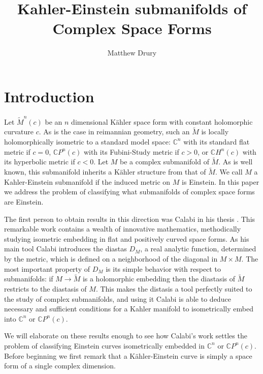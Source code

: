 \documentclass[11pt]{amsart}
\title{ Kahler-Einstein submanifolds of Complex Space Forms }
\author{ Matthew Drury }
\theoremstyle{definition}
\def \CP{ \mathbb{C}P }
\def \C{ \mathbb{C} }
\def \CH{ \mathbb{C}H }
\def \Mamb{ \mathcal{M} }
\def \Mamb{ \tilde{M} }
\begin{document}
\maketitle

\parskip 6pt
\parindent 0pt
\baselineskip 14pt

\section{Introduction}

Let $\Mamb^n(c)$ be an $n$ dimensional K\"{a}hler space form with constant holomorphic curvature $c$.  As is the case in reimannian geometry, such an $\Mamb$ is locally holomorphically isometric to a standard model space: $\C^n$ with its standard flat metric if $c=0$, $\CP^n(c)$ with its Fubini-Study metric if $c>0$, or $\CH^n(c)$ with its hyperbolic metric if $c<0$.  Let $M$ be a complex submanifold of $\Mamb$.  As is well known, this submanifold inherits a K\"{a}hler structure from that of $\Mamb$.  We call $M$ a Kahler-Einstein submanifold if the induced metric on $M$ is Einstein.  In this paper we address the problem of classifying what submanifolds of complex space forms are Einstein.

The first person to obtain results in this direction was Calabi in his thesis \cite{C1}.  This remarkable work contains a wealth of innovative mathematics, methodically studying isometric embedding in flat and positively curved space forms.  As his main tool Calabi introduces the diastas $D_M$, a real analytic function, determined by the metric, which is defined on a neighborhood of the diagonal in $M \times M$.  The most important property of $D_M$ is its simple behavior with respect to submanifolds:  if $M \rightarrow \Mamb$ is a holomorphic embedding then the diastasis of $\Mamb$ restricts to the diastasis of $M$.  This makes the distasis a tool perfectly suited to the study of complex submanifolds, and using it Calabi is able to deduce necessary and sufficient conditions for a Kahler manifold to isometrically embed into $\C^n$ or $\CP^n(c)$.  

We will elaborate on these results enough to see how Calabi's work settles the problem of classifying Einstein curves isometrically embedded in $\C^n$ or $\CP^n(c)$.  Before beginning we first remark that a K\"{a}hler-Einstein curve is simply a space form of a single complex dimension.  
\end{document}
